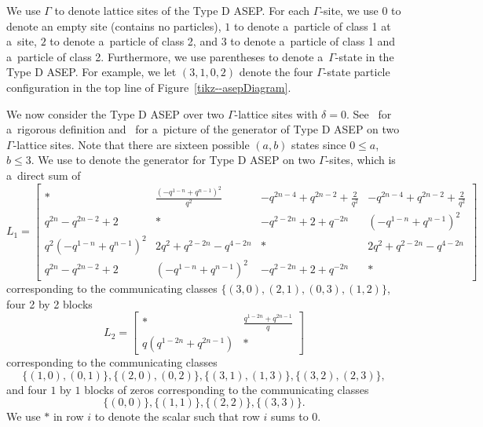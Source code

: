 \documentclass[pdftex]{sigma}
\numberwithin{equation}{section}
\theoremstyle{definition}
\begin{document}
We use $\Gamma$ to denote lattice sites of the Type D ASEP. For each $\Gamma$-site, we use $0$ to denote an empty site (contains no particles), $1$ to denote a~particle of class 1 at a~site, $2$ to denote a~particle of class 2, and $3$ to denote a~particle of class 1 and a~particle of class 2. Furthermore, we use parentheses to denote a~$\Gamma$-state in the Type D ASEP. For example, we let $(3,1,0,2)$ denote the four $\Gamma$-state particle configuration in the top line of Figure~\ref{tikz--asepDiagram}.

We now consider the Type D ASEP over two $\Gamma$-lattice sites with $\delta = 0$. See~\cite{rohr2023type} for a~rigorous definition and~\cite{kuan2020interactingparticlesystemstype} for a~picture of the generator of Type D ASEP on two $\Gamma$-lattice sites. Note that there are sixteen possible $(a,b)$ states since $0 \leq a$, $b \leq 3$. We use  to denote the generator for Type D ASEP on two $\Gamma$-sites, which is a~direct sum of
\[
L_1 =
\left[\begin{smallmatrix}
* & \frac{(- q^{1 - n} + q^{n - 1})^{2}}{q^{2}} & - q^{2 n - 4} + q^{2 n - 2} + \frac{2}{q^{2}} & - q^{2 n - 4} + q^{2 n - 2} + \frac{2}{q^{2}}
\\q^{2 n} - q^{2 n - 2} + 2 & * & - q^{2 - 2 n} + 2 + q^{- 2 n} & (- q^{1 - n} + q^{n - 1})^{2}
\\
q^{2} (- q^{1 - n} + q^{n - 1})^{2} & 2 q^{2} + q^{2 - 2 n} - q^{4 - 2 n} & * & 2 q^{2} + q^{2 - 2 n} - q^{4 - 2 n}
\\q^{2 n} - q^{2 n - 2} + 2 & (- q^{1 - n} + q^{n - 1})^{2} & - q^{2 - 2 n} + 2 + q^{- 2 n} & *
\end{smallmatrix}\right]
\]
corresponding to the communicating classes $\{(3,0),(2,1),(0,3),(1,2)\}$, four 2 by 2 blocks
\[L_2 = \begin{bmatrix} * & \frac{q^{1 - 2 n} + q^{2 n - 1}}{q}\\q \left(q^{1 - 2 n} + q^{2 n - 1}\right) & * \end{bmatrix}\]
corresponding to the communicating classes \[\{(1,0),(0,1)\},\{(2,0),(0,2)\},\{(3,1),(1,3)\},\{(3,2),(2,3)\},\] and four $1$ by $1$ blocks of zeros corresponding to the communicating classes \[\{(0,0)\},\{(1,1)\},\{(2,2)\},\{(3,3)\}.\] We use $*$ in row $i$ to denote the scalar such that row $i$ sums to 0.
\end{document}
